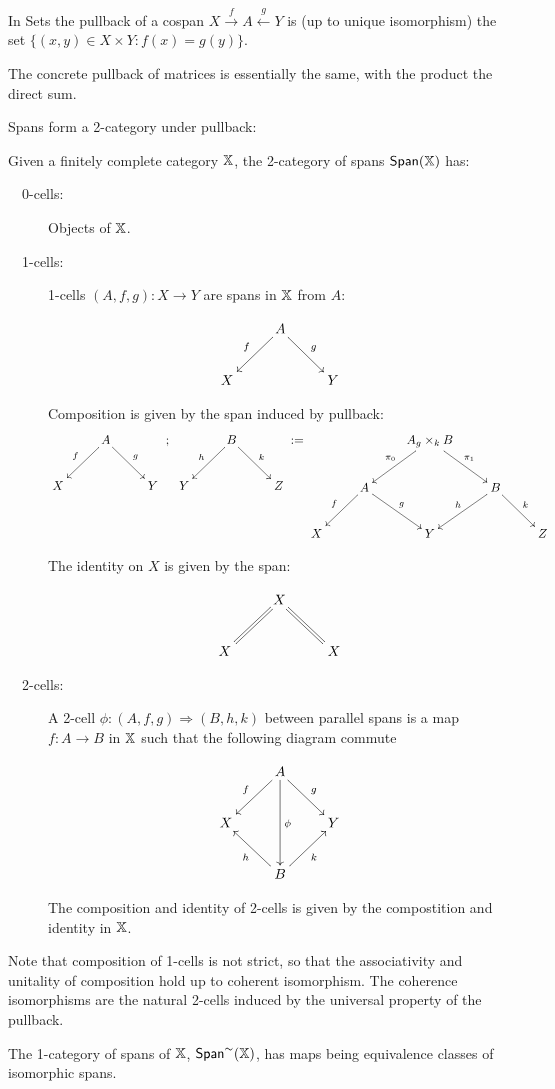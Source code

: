 \begin{example} 
In Sets the pullback of a cospan $X \xrightarrow{f} A \xleftarrow{g} Y$ is (up to unique isomorphism) the set $\{(x,y) \in X\times Y : f(x) = g(y)\}$.


The concrete pullback of matrices is essentially the same, with the product the direct sum.
\end{example}

Spans form a 2-category under pullback:
\begin{definition}
Given a finitely complete category $\mathbb{X}$, the 2-category of spans $\mathsf{Span}(\mathbb{X})$ has:

\begin{description}
\item[\ \ 0-cells:] Objects of $\mathbb{X}$.
\item[\ \ 1-cells:] 1-cells $(A,f,g):X\to Y$ are spans in $\mathbb{X}$ from $A$:

$$
\xymatrix{
    & A \ar[dl]_{f} \ar[dr]^{g}
    &
  \\X 
    &
    & Y
}
$$

Composition is given by the span induced by pullback:
$$
\xymatrix{
    & A\ar[dl]_{f} \ar[dr]^{g}
    &
  \\X 
    &
    & Y
}\ ;\
\xymatrix{
    & B\ar[dl]_{h} \ar[dr]^{k}
    &
  \\Y 
    &
    & Z
}
:=
\xymatrix{
    &
    & A {}_g\times_k B \ar[dl]_{\pi_0} \ar[dr]^{\pi_1}
    &
    &
  \\
    & A \ar[dl]_{f} \ar[dr]^{g}
    &
    & B \ar[dl]_{h} \ar[dr]^{k}
    &
  \\X
    &
    & Y
    &
    & Z
}
$$

The identity on $X$ is given by the span:

$$
\xymatrix{
    & X \ar@{=}[dl] \ar@{=}[dr] 
    &
  \\X 
    &
    & X
}
$$

\item[\ \ 2-cells:] A 2-cell $\phi:(A,f,g)\Rightarrow (B,h,k)$ between parallel spans is a map $f:A\to B$ in $\mathbb{X}$ such that the following diagram commute

$$
\xymatrix{
    & A \ar[dl]_{f} \ar[dr]^{g} \ar[dd]^{\phi}
    &
  \\X 
    &
    & Y
  \\
    & B \ar[ul]^{h} \ar[ur]_{k}
    &
}
$$

The composition and identity of  2-cells is given by the compostition and identity in $\mathbb{X}$.
\end{description}

Note that composition of 1-cells is not strict, so that the associativity and unitality of composition hold up to coherent isomorphism.  The coherence isomorphisms are the natural 2-cells induced by the universal property of the pullback.


The 1-category of spans of $\mathbb{X}$, $\mathsf{Span}^\sim(\mathbb{X})$, has maps being equivalence classes of isomorphic spans. 
\end{definition}


